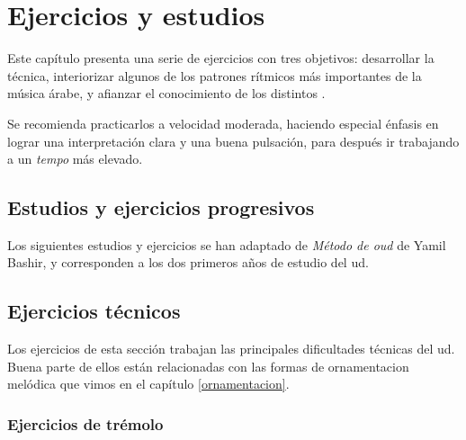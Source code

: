 \label{ejercicios}
\chapter{Ejercicios y estudios}


Este capítulo presenta una serie de ejercicios con tres objetivos: desarrollar la técnica, interiorizar algunos de los patrones rítmicos más importantes de la música árabe, y afianzar el conocimiento de los distintos \maqamaatb.

Se recomienda practicarlos a velocidad moderada, haciendo especial énfasis en lograr una interpretación clara y una buena pulsación, para después ir trabajando a un \emph{tempo} más elevado.

\section{Estudios y ejercicios progresivos}

Los siguientes estudios y ejercicios se han adaptado de \emph{Método de oud} de Yamil Bashir, y corresponden a los dos primeros años de estudio del ud.

\section{Ejercicios técnicos}

Los ejercicios de esta sección trabajan las principales dificultades técnicas del ud. Buena parte de ellos están relacionadas con las formas de ornamentacion melódica que vimos en el capítulo \ref{ornamentacion}.

\subsection{Ejercicios de trémolo}

\newexercise{}
\begin{center}
\end{center}

